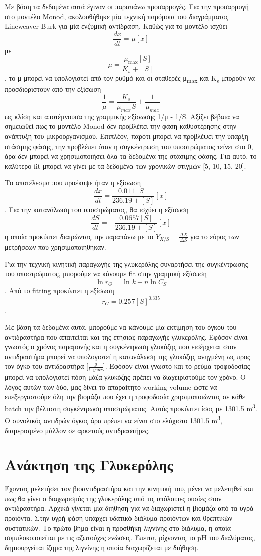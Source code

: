 \documentclass[11pt]{article}
\begin{document}
Με βάση τα δεδομένα αυτά έγιναν οι παραπάνω προσαρμογές. Για την προσαρμογή στο μοντέλο Monod, ακολουθήθηκε μία τεχνική παρόμοια του διαγράμματος Lineweaver-Burk για μία ενζυμική αντίδραση. Καθώς για το μοντέλο ισχύει \[ \frac{dx}{dt} = μ[x] \] με \[ μ = \frac{μ_{\max }[S]}{K_s+[S]} \], το μ μπορεί να υπολογιστεί από τον ρυθμό και οι σταθερές μ\textsubscript{max} και K\textsubscript{s} μπορούν να προσδιοριστούν από την εξίσωση \[ \frac{1}{μ} = \frac{K_s}{μ_{max}S} + \frac{1}{μ_{max}} \] ως κλίση και αποτέμνουσα της γραμμικής εξίσωσης 1/μ - 1/S. Αξίζει βέβαια να σημειωθεί πως το μοντέλο Monod δεν προβλέπει την φάση καθυστέρησης στην ανάπτυξη του μικροοργανισμού. Επιπλέον, παρότι μπορεί να προβλέψει την ύπαρξη στάσιμης φάσης, την προβλέπει όταν η συγκέντρωση του υποστρώματος τείνει στο 0, άρα δεν μπορεί να χρησιμοποιήσει όλα τα δεδομένα της στάσιμης φάσης. Για αυτό, το καλύτερο fit μπορεί να γίνει με τα δεδομένα των χρονικών στιγμών [5, 10, 15, 20].

Το αποτέλεσμα που προέκυψε ήταν η εξίσωση \[ \frac{dx}{dt} = \frac{0.011 [S]}{236.19 + [S]}[x] \]. Για την κατανάλωση του υποστρώματος, θα ισχύει η εξίσωση \[ \frac{dS}{dt} = - \frac{0.0657[S]}{236.19 + [S]}[x] \] η οποία προκύπτει διαιρώντας την παραπάνω με το \(Y_{X / S} = \frac{ΔX}{ΔS}\) για το εύρος των μετρήσεων που χρησιμοποιήθηκαν.

Για την τεχνική κινητική παραγωγής της γλυκερόλης συναρτήσει της συγκέντρωσης του υποστρώματος, μπορούμε να κάνουμε fit στην γραμμική εξίσωση \[ \ln r_G = \ln k + n \ln C_S\]. Από το fitting προκύπτει η εξίσωση \[ r_G = 0.257 [S]^{0.335} \].

Με βάση τα δεδομένα αυτά, μπορούμε να κάνουμε μία εκτίμηση του όγκου του αντιδραστήρα που απαιτείται και της ετήσιας παραγωγής γλυκερόλης. Εφόσον είναι γνωστός ο χρόνος παραμονής και η συγκέντρωση γλυκόζης που εισέρχεται στον αντιδραστήρα μπορεί να υπολογιστεί η κατανάλωση της γλυκόζης ανηγμένη ως προς τον όγκο του αντιδραστήρα [\(\frac{g}{l \cdot year}\)]. Εφόσον είναι γνωστό και το ρεύμα τροφοδοσίας μπορεί να υπολογιστεί πόση μάζα γλυκόζης πρέπει να διαχειριστούμε τον χρόνο. Ο λόγος αυτών των δύο, μας δίνει το απαραίτητο working volume ώστε να επεξεργαστούμε όλη την βιομάζα που έχει η τροφοδοσία χρησιμοποιώντας σε κάθε batch την βέλτιστη συγκέντρωση υποστρώματος. Αυτός προκύπτει ίσος με 1301.5 m\textsuperscript{3}. Ο συνολικός αντιδρών όγκος άρα πρέπει να είναι στο ελάχιστο 1301.5 m\textsuperscript{3}, διαμερισμένο μάλλον σε αρκετούς αντιδραστήρες.

\section{Ανάκτηση της Γλυκερόλης}
\label{sec:orgcbf387c}
Έχοντας μελετήσει τον βιοαντιδραστήρα και την κινητική του, μένει να μελετηθεί και πως θα γίνει ο διαχωρισμός της γλυκερόλης από τις υπόλοιπες ουσίες στον αντιδραστήρα. Αρχικά γίνεται μία διήθηση για να διαχωριστεί η βιομάζα από τα υγρά προιόντα. Στην υγρή φάση υπάρχει υδατικό διάλυμα προιόντων και θρεπτικών συστατικών. Το πρώτο βήμα είναι η προσθήκη λιγνίνης στο διάλυμα, η οποία συμπλοκοποιείται με τις αζωτούχες ενώσεις. Έπειτα, ρίχνοντας το pH του διαλύματος, δημιουργείται ίζημα της λιγνίνης η οποία διαχωρίζεται με διήθηση.
\end{document}
